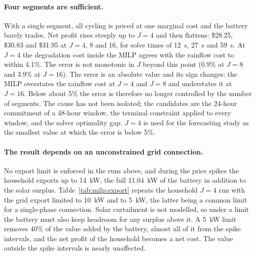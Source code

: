 \paragraph{Four segments are sufficient.}
With a single segment, all cycling is priced at one marginal cost and the battery barely
trades. Net profit rises steeply up to $J = 4$ and then flattens: \$28.25, \$30.83 and
\$31.95 at $J = 4$, 8 and 16, for solve times of 12~s, 27~s and 59~s. At $J = 4$ the
degradation cost inside the MILP agrees with the rainflow cost to within 4.1\%. The
error is not monotonic in $J$ beyond this point (0.9\% at $J = 8$ and 3.9\% at
$J = 16$). The error is an absolute value and its sign changes: the MILP overstates the
rainflow cost at $J = 4$ and $J = 8$ and understates it at $J = 16$. Below about 5\% the
error is therefore no longer controlled by the number of segments. The cause has not
been isolated; the candidates are the 24-hour commitment of a 48-hour window, the
terminal constraint applied to every window, and the solver optimality gap. $J = 4$ is
used for the forecasting study as the smallest value at which the error is below 5\%.

\paragraph{The result depends on an unconstrained grid connection.}
No export limit is enforced in the runs above, and during the price spikes the household
exports up to 14~kW, the full 11.04~kW of the battery in addition to the solar
surplus. Table~\ref{tab:milp:export} repeats the household $J = 4$ run with the grid
export limited to 10~kW and to 5~kW, the latter being a common limit for a single-phase
connection. Solar curtailment is not modelled, so under a limit the battery must also
keep headroom for any surplus above it. A 5~kW limit removes 40\% of the value added by
the battery, almost all of it from the spike intervals, and the net profit of the
household becomes a net cost. The value outside the spike intervals is nearly
unaffected.

